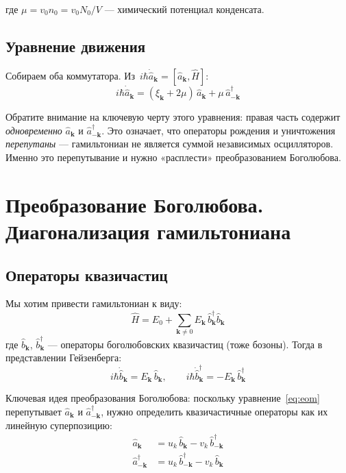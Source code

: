 \documentclass[../general/general]{subfiles}
\begin{document}
где $\mu = v_0 n_0 = v_0 N_0/V$ --- химический потенциал конденсата.

\subsection{Уравнение движения}

Собираем оба коммутатора. Из~$i\hbar\dot{\hat{a}}_\mathbf{k} = [\hat{a}_\mathbf{k},\hat{H}]$:
\begin{equation}
    \boxed{i\hbar\dot{\hat{a}}_\mathbf{k} = (\xi_\mathbf{k} + 2\mu)\,\hat{a}_\mathbf{k} + \mu\,\hat{a}^\dagger_{-\mathbf{k}}}
    \label{eq:eom}
\end{equation}

Обратите внимание на ключевую черту этого уравнения: правая часть содержит \emph{одновременно} $\hat{a}_\mathbf{k}$ и $\hat{a}^\dagger_{-\mathbf{k}}$. Это означает, что операторы рождения и уничтожения \emph{перепутаны} --- гамильтониан не является суммой независимых осцилляторов. Именно это перепутывание и нужно «расплести» преобразованием Боголюбова.


\section{Преобразование Боголюбова. Диагонализация гамильтониана}

\subsection{Операторы квазичастиц}

Мы хотим привести гамильтониан к виду:
\begin{equation}
    \hat{H} = E_0 + \sum_{\mathbf{k}\neq 0} E_\mathbf{k}\,\hat{b}^\dagger_\mathbf{k}\hat{b}_\mathbf{k}
    \label{eq:H_diag}
\end{equation}
где $\hat{b}_\mathbf{k}$, $\hat{b}^\dagger_\mathbf{k}$ --- операторы боголюбовских квазичастиц (тоже бозоны). Тогда в представлении Гейзенберга:
\begin{equation}
    i\hbar\dot{\hat{b}}_\mathbf{k} = E_\mathbf{k}\,\hat{b}_\mathbf{k}, \qquad
    i\hbar\dot{\hat{b}}^\dagger_\mathbf{k} = -E_\mathbf{k}\,\hat{b}^\dagger_\mathbf{k}
\end{equation}

Ключевая идея преобразования Боголюбова: поскольку уравнение~\eqref{eq:eom} перепутывает $\hat{a}_\mathbf{k}$ и $\hat{a}^\dagger_{-\mathbf{k}}$, нужно определить квазичастичные операторы как их линейную суперпозицию:
\begin{align}
    \hat{a}_\mathbf{k} &= u_k\,\hat{b}_\mathbf{k} - v_k\,\hat{b}^\dagger_{-\mathbf{k}}
    \label{eq:bogolubov_a} \\
    \hat{a}^\dagger_{-\mathbf{k}} &= u_k\,\hat{b}^\dagger_{-\mathbf{k}} - v_k\,\hat{b}_\mathbf{k}
    \label{eq:bogolubov_ad}
\end{align}
\end{document}
